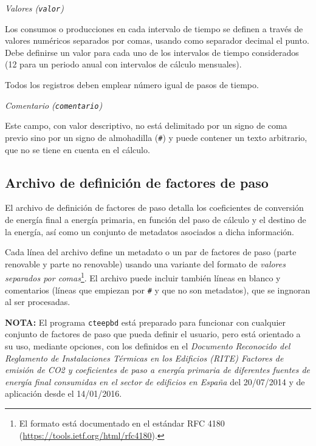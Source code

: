 \documentclass[10pt,notitlepage,oneside,a4paper]{article}
\begin{document}
\textit{Valores (\texttt{valor})}

Los consumos o producciones en cada intervalo de tiempo se definen a través de valores numéricos separados por comas, usando como separador decimal el punto. Debe definirse un valor para cada uno de los intervalos de tiempo considerados (12 para un periodo anual con intervalos de cálculo mensuales).

Todos los registros deben emplear número igual de pasos de tiempo.

\textit{Comentario (\texttt{comentario})}

Este campo, con valor descriptivo, no está delimitado por un signo de coma previo sino por un signo de almohadilla (\texttt{\#}) y puede contener un texto arbitrario, que no se tiene en cuenta en el cálculo.

\clearpage
\newpage
\subsection{Archivo de definición de factores de paso}\label{sec:formatofactorespaso}

El archivo de definición de factores de paso detalla los coeficientes de conversión de energía final a energía primaria, en función del paso de cálculo y el destino de la energía, así como un conjunto de metadatos asociados a dicha información.

Cada línea del archivo define un metadato o un par de factores de paso (parte renovable y parte no renovable) usando una variante del formato de \textit{valores separados por comas}\footnote{El formato está documentado en el estándar RFC 4180 (\url{https://tools.ietf.org/html/rfc4180}).}. El archivo puede incluir también líneas en blanco y comentarios (líneas que empiezan por \texttt{\#} y que no son metadatos), que se ingnoran al ser procesadas.

\begin{myquote}\small
\textbf{NOTA:} El programa \texttt{cteepbd} está preparado para funcionar con cualquier conjunto de factores de paso que pueda definir el usuario, pero está orientado a su uso, mediante opciones, con los definidos en el \textit{Documento Reconocido del Reglamento de Instalaciones Térmicas en los Edificios (RITE) Factores de emisión de CO2 y coeficientes de paso a energía primaria de diferentes fuentes de energía final consumidas en el sector de edificios en España} del 20/07/2014 y de aplicación desde el 14/01/2016.
\end{myquote}
\end{document}
